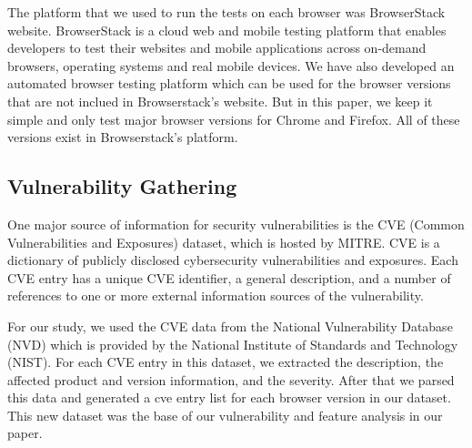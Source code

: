
The platform that we used to run the tests on each browser was BrowserStack website. BrowserStack is a cloud web and mobile testing platform that enables developers to test their websites and mobile applications across on-demand browsers, operating systems and real mobile devices.
We have also developed an automated browser testing platform which can be used for the browser versions that are not inclued in Browserstack's website. But in this paper, we keep it simple and only test major browser versions for Chrome and Firefox. All of these versions exist in Browserstack's platform.


\subsection{Vulnerability Gathering}
One major source of information for security vulnerabilities is the CVE (Common Vulnerabilities and Exposures) dataset,
which is hosted by MITRE. CVE is a dictionary of publicly disclosed cybersecurity vulnerabilities and exposures. Each CVE entry
has a unique CVE identifier, a general description, and a number of references to one or more external information sources of
the vulnerability.

For our study, we used the CVE data from the National Vulnerability Database
(NVD) which is provided by the National Institute of Standards and Technology (NIST).
For each CVE entry in this dataset, we extracted the description, the affected product and version information, and the severity. After that we parsed this data and generated a cve entry list for each browser version in our dataset. This new dataset was the base of our vulnerability and feature analysis in our paper.


